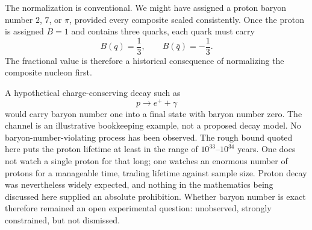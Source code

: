 \begin{classroomqa}
\end{classroomqa}

The normalization is conventional. We might have assigned a proton baryon number \(2\), \(7\), or \(\pi\), provided every composite scaled consistently. Once the proton is assigned \(B=1\) and contains three quarks, each quark must carry
\begin{equation}
B(q)=\frac13,
\qquad
B(\bar q)=-\frac13.
\end{equation}
The fractional value is therefore a historical consequence of normalizing the composite nucleon first.

\begin{classroomqa}
\end{classroomqa}

A hypothetical charge-conserving decay such as
\begin{equation}
p\longrightarrow e^++\gamma
\end{equation}
would carry baryon number one into a final state with baryon number zero. The channel is an illustrative bookkeeping example, not a proposed decay model. No baryon-number-violating process has been observed. The rough bound quoted here puts the proton lifetime at least in the range of \(10^{33}\)--\(10^{34}\) years. One does not watch a single proton for that long; one watches an enormous number of protons for a manageable time, trading lifetime against sample size. Proton decay was nevertheless widely expected, and nothing in the mathematics being discussed here supplied an absolute prohibition. Whether baryon number is exact therefore remained an open experimental question: unobserved, strongly constrained, but not dismissed.

\begin{classroomqa}
\end{classroomqa}

